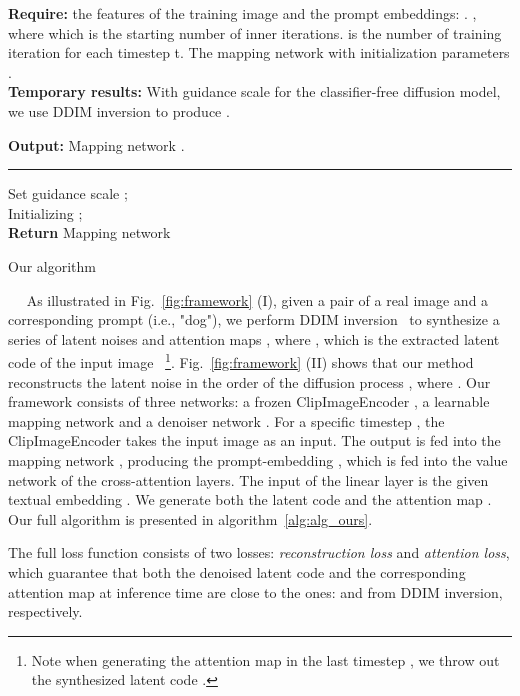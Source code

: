 \documentclass[twocolumn]{svjour3}          \smartqed  \usepackage{graphicx}
\newcommand{\minisection}[1]{\vspace{0.04in} \noindent {\bf #1}\ \ }
\begin{document}
\begin{algorithm}[t]
\SetAlgoLined
\textbf{Require:} the features of the training image and the prompt embeddings: . , where  which is the starting number of inner iterations.
 is the number of training iteration for each timestep t.
The mapping network  with initialization parameters .\\
\textbf{Temporary results:} With guidance scale  for the classifier-free diffusion model, we use DDIM inversion to produce .

\textbf{Output:} 
Mapping network .\\
 \vspace{1mm} \hrule \vspace{1mm}
 Set guidance scale ; \\
 Initializing ; \\
 \textbf{Return} Mapping network 
\caption{Our algorithm}\label{alg:alg_ours}
\end{algorithm}



\minisection{Method overview.}
As illustrated in Fig.~\ref{fig:framework} (I),  given a pair of a real image  and a corresponding prompt  (i.e., "dog"),  we  perform DDIM inversion~\citep{dhariwal2021diffusion,song2020denoising} to synthesize a series of latent noises  and attention maps , where , which is the extracted  latent code of the input image  ~\footnote{Note  when generating the attention map  in the last timestep , we throw out the synthesized latent code . }.
Fig.~\ref{fig:framework} (II)   shows that our method reconstructs the latent noise  in the order of the diffusion process , where . Our framework consists of three networks: a frozen ClipImageEncoder ,   a learnable mapping network  and a denoiser network .  For a specific timestep , the  ClipImageEncoder  takes the input image  as an input. The output  is fed into the mapping network , producing the prompt-embedding , which is fed into the value network  of the cross-attention layers. The  input of the linear layer  is the given textual embedding . We generate both the latent code  and the attention map . 
Our full algorithm is presented in algorithm~\ref{alg:alg_ours}.

The full loss function consists of two losses:   \textit{reconstruction loss} and \textit{attention loss}, which   guarantee
that both  the denoised latent code  and  the  corresponding attention map   at inference time are close to the ones:  and   from DDIM inversion, respectively. 
\end{document}
